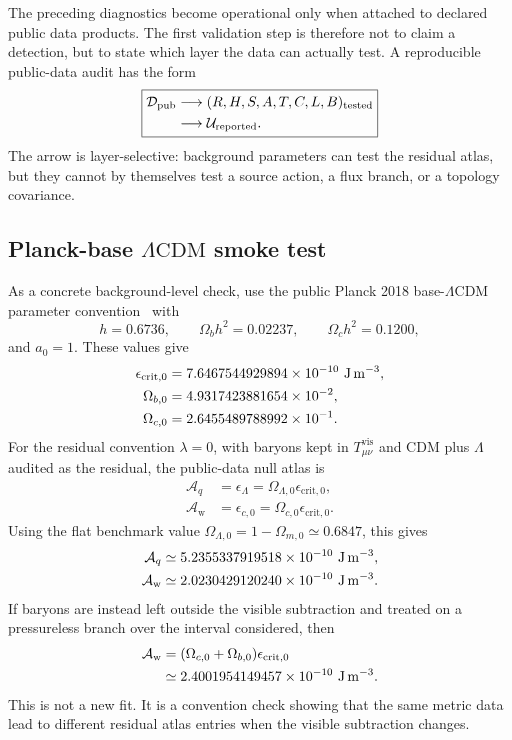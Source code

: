 \documentclass[
  aps,
  prd,
  reprint,
  superscriptaddress,
  floatfix,
  nofootinbib,
  longbibliography
]{revtex4-2}
\theoremstyle{plain}
\theoremstyle{definition}
\theoremstyle{remark}
\newcommand{\vis}{\mathrm{vis}}
\newcommand{\crit}{\mathrm{crit}}
\newcommand{\Aq}{\mathcal A_q}
\newcommand{\Aw}{\mathcal A_{\mathrm w}}
\newcommand{\LCDM}{\Lambda\mathrm{CDM}}
\newcommand{\Ucal}{\mathcal U}
\begin{document}
The preceding diagnostics become operational only when attached to declared public data products.  The first validation step is therefore not to claim a detection, but to state which layer the data can actually test.  A reproducible public-data audit has the form
\begin{equation}
\boxed{
\begin{aligned}
\mathcal D_{\rm pub}
&\longrightarrow (R,H,S,A,T,C,L,B)_{\rm tested}\\
&\longrightarrow \Ucal_{\rm reported}.
\end{aligned}}
\label{eq:public_data_audit}
\end{equation}
The arrow is layer-selective: background parameters can test the residual atlas, but they cannot by themselves test a source action, a flux branch, or a topology covariance.

\subsection{Planck-base \texorpdfstring{\(\LCDM\)}{LambdaCDM} smoke test}

As a concrete background-level check, use the public Planck 2018 base-\(\LCDM\) parameter convention~\cite{Planck2018Params} with
\begin{equation}
h=0.6736,\qquad
\Omega_bh^2=0.02237,\qquad
\Omega_ch^2=0.1200 ,
\end{equation}
and \(a_0=1\).  These values give
\begin{align}
\epsilon_{\crit,0}
&=7.6467544929894\times10^{-10}\ {\rm J\,m^{-3}},\\
\Omega_{b,0}&=4.9317423881654\times10^{-2},\\
\Omega_{c,0}&=2.6455489788992\times10^{-1}.
\end{align}
For the residual convention \(\lambda=0\), with baryons kept in \(T^{\vis}_{\mu\nu}\) and CDM plus \(\Lambda\) audited as the residual, the public-data null atlas is
\begin{align}
\Aq&=\epsilon_\Lambda=\Omega_{\Lambda,0}\epsilon_{\crit,0},\\
\Aw&=\epsilon_{c,0}=\Omega_{c,0}\epsilon_{\crit,0}.
\end{align}
Using the flat benchmark value \(\Omega_{\Lambda,0}=1-\Omega_{m,0}\simeq0.6847\), this gives
\begin{align}
\Aq&\simeq5.2355337919518\times10^{-10}\ {\rm J\,m^{-3}},\\
\Aw&\simeq2.0230429120240\times10^{-10}\ {\rm J\,m^{-3}}.
\end{align}
If baryons are instead left outside the visible subtraction and treated on a pressureless branch over the interval considered, then
\begin{align}
\Aw&=(\Omega_{c,0}+\Omega_{b,0})\epsilon_{\crit,0}\nonumber\\
&\simeq2.4001954149457\times10^{-10}\ {\rm J\,m^{-3}}.
\end{align}
This is not a new fit.  It is a convention check showing that the same metric data lead to different residual atlas entries when the visible subtraction changes.
\end{document}
